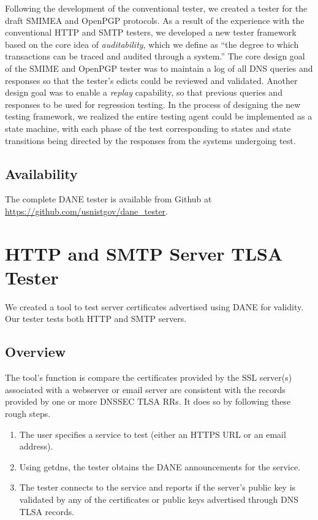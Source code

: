 \documentclass[preprint,3p]{elsarticle}
\begin{document}
Following the development of the conventional tester, we created a
tester for the draft SMIMEA and OpenPGP protocols. As a result of the
experience with the conventional HTTP and SMTP testers, we developed a
new tester framework based on the core idea of \emph{auditability},
which we define as ``the degree to which transactions can be traced
and audited through a system.'' The core design goal of the SMIME and
OpenPGP tester was to maintain a log of all DNS queries and responses
so that the tester's edicts could be reviewed and validated. Another
design goal was to enable a \emph{replay} capability, so that previous
queries and responses to be used for regression testing. In the
process of designing the new testing framework, we realized the entire
testing agent could be implemented as a state machine, with each phase
of the test corresponding to states and state transitions being
directed by the responses from the systems undergoing test.


\subsection{Availability}

The complete DANE tester is available from Github at \url{https://github.com/usnistgov/dane_tester}.

\section{HTTP and SMTP Server TLSA Tester}
We created a tool to test server certificates advertised using DANE
for validity. Our tester tests both HTTP and SMTP servers. 

\subsection{Overview}

The tool's function is compare the certificates provided by the
SSL server(s) associated with a webserver or email server are
consistent with the records provided by one or more DNSSEC TLSA
RRs. It does so by following these rough steps. 

\begin{enumerate}
\item The user specifies a service to test (either an HTTPS URL or an
  email address).
\item Using getdns, the tester obtains the DANE announcements for the
  service. 
\item The tester connects to the service and reports if the server's
  public key is validated by any of the   certificates or public keys
  advertised through DNS TLSA records. 
\end{enumerate}
\end{document}
